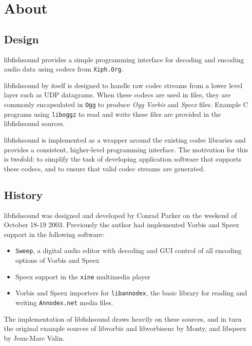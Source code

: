 \section{About}
\label{group__about}
\subsection{Design}\label{group__about_design}
libfishsound provides a simple programming interface for decoding and encoding audio data using codecs from {\tt Xiph.Org}.

libfishsound by itself is designed to handle raw codec streams from a lower level layer such as UDP datagrams. When these codecs are used in files, they are commonly encapsulated in {\tt Ogg} to produce {\em Ogg Vorbis\/} and {\em Speex\/} files. Example C programs using {\tt liboggz} to read and write these files are provided in the libfishsound sources.

libfishsound is implemented as a wrapper around the existing codec libraries and provides a consistent, higher-level programming interface. The motivation for this is twofold: to simplify the task of developing application software that supports these codecs, and to ensure that valid codec streams are generated.\subsection{History}\label{group__about_history}
libfishsound was designed and developed by Conrad Parker on the weekend of October 18-19 2003. Previously the author had implemented Vorbis and Speex support in the following software:\begin{itemize}
\item {\tt Sweep}, a digital audio editor with decoding and GUI control of all encoding options of Vorbis and Speex\item Speex support in the {\tt xine} multimedia player\item Vorbis and Speex importers for {\tt libannodex}, the basic library for reading and writing {\tt Annodex.net} media files.\end{itemize}


The implementation of libfishsound draws heavily on these sources, and in turn the original example sources of libvorbis and libvorbisenc by Monty, and libspeex by Jean-Marc Valin.


